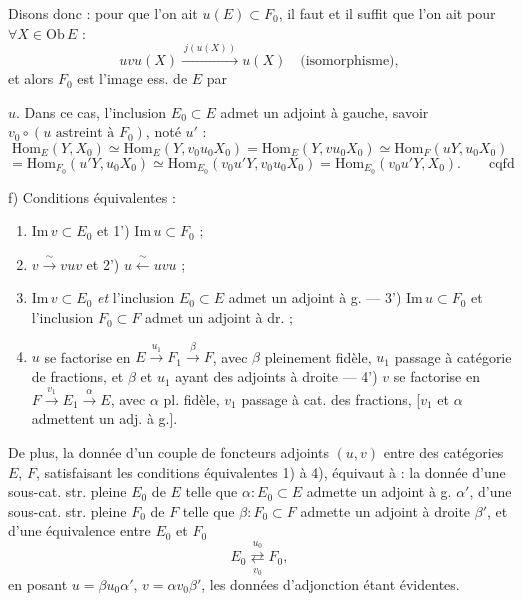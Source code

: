 \documentclass[11pt,a4paper]{article}
\begin{document}
Disons donc : pour que l'on ait $u(E) \subset F_0$, il faut et il suffit que
l'on ait pour $\forall X \in \mathrm{Ob}\,E$ :
\[
uvu(X) \xrightarrow{\ j(u(X))\ } u(X) \quad \text{(isomorphisme)},
\]
et alors $F_0$ est l'image ess. de $E$ par

$u$. Dans ce cas, l'inclusion $E_0 \subset E$ admet un adjoint à gauche,
savoir $v_0 \circ (u \text{ astreint à } F_0)$, noté $u'$ :
\[
\mathrm{Hom}_E(Y, X_0) \simeq \mathrm{Hom}_E(Y, v_0 u_0 X_0)
= \mathrm{Hom}_E(Y, v u_0 X_0)
\simeq \mathrm{Hom}_F(uY, u_0 X_0)
\]
\[
= \mathrm{Hom}_{F_0}(u'Y, u_0 X_0)
\simeq \mathrm{Hom}_{E_0}(v_0 u' Y, v_0 u_0 X_0)
= \mathrm{Hom}_{E_0}(v_0 u' Y, X_0). \qquad \text{cqfd}
\]

f) Conditions équivalentes :

\begin{enumerate}
\item $\mathrm{Im}\,v \subset E_0$ et 1') $\mathrm{Im}\,u \subset F_0$ ;
\item $v \xrightarrow{\ \sim\ } vuv$ et 2') $u \xleftarrow{\ \sim\ } uvu$ ;
\item $\mathrm{Im}\,v \subset E_0$ \emph{et} l'inclusion $E_0 \subset E$
admet un adjoint à g.  — 3') $\mathrm{Im}\,u \subset F_0$ et l'inclusion
$F_0 \subset F$ admet un adjoint à dr. ;
\item $u$ se factorise en $E \xrightarrow{u_1} F_1 \xrightarrow{\beta} F$,
avec $\beta$ pleinement fidèle, $u_1$ passage à catégorie de
fractions, et $\beta$ et $u_1$ ayant des adjoints à droite
 — 4') $v$ se factorise en
$F \xrightarrow{v_1} E_1 \xrightarrow{\alpha} E$, avec $\alpha$ pl. fidèle,
$v_1$ passage à cat. des fractions, [$v_1$ et $\alpha$ admettent un adj. à
g.].
\end{enumerate}

 De plus, la donnée d'un couple de foncteurs adjoints $(u,v)$
entre des catégories $E$, $F$, satisfaisant les conditions
équivalentes 1) à 4), équivaut à : la donnée d'une sous-cat. str.
pleine $E_0$ de $E$ telle que $\alpha : E_0 \subset E$ admette un adjoint à
g. $\alpha'$, d'une sous-cat. str. pleine $F_0$ de $F$ telle que
$\beta : F_0 \subset F$ admette un adjoint à droite $\beta'$, et d'une
équivalence entre $E_0$ et $F_0$
\[
E_0 \underset{v_0}{\overset{u_0}{\rightleftarrows}} F_0,
\]
en posant $u = \beta u_0 \alpha'$, $v = \alpha v_0 \beta'$, les données
d'adjonction étant évidentes.
\end{document}
